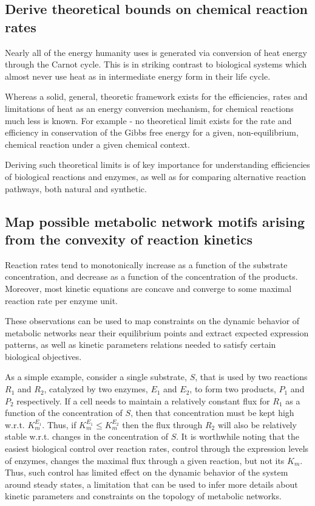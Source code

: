 \documentclass[notitlepage]{article}
\begin{document}
\subsection{Derive theoretical bounds on chemical reaction rates}
Nearly all of the energy humanity uses is generated via conversion of heat energy through the Carnot cycle.
This is in striking contrast to biological systems which almost never use heat as in intermediate energy form in their life cycle.

Whereas a solid, general, theoretic framework exists for the efficiencies, rates and limitations of heat as an energy conversion mechanism, for chemical reactions much less is known.
For example - no theoretical limit exists for the rate and efficiency in conservation of the Gibbs free energy for a given, non-equilibrium, chemical reaction under a given chemical context.

Deriving such theoretical limits is of key importance for understanding efficiencies of biological reactions and enzymes, as well as for comparing alternative reaction pathways, both natural and synthetic.

\subsection{Map possible metabolic network motifs arising from the convexity of reaction kinetics}
Reaction rates tend to monotonically increase as a function of the substrate concentration, and decrease as a function of the concentration of the products.
Moreover, most kinetic equations are concave and converge to some maximal reaction rate per enzyme unit.

These observations can be used to map constraints on the dynamic behavior of metabolic networks near their equilibrium points and extract expected expression patterns, as well as kinetic parameters relations needed to satisfy certain biological objectives.

As a simple example, consider a single substrate, $S$, that is used by two reactions $R_1$ and $R_2$, catalyzed by two enzymes, $E_1$ and $E_2$, to form two products, $P_1$ and $P_2$ respectively.
If a cell needs to maintain a relatively constant flux for $R_1$ as a function of the concentration of $S$, then 
that concentration must be kept high w.r.t. $K_m^{E_1}$.
Thus, if $K_m^{E_1} \le K_m^{E_2}$ then the flux through $R_2$ will also be relatively stable w.r.t. changes in the concentration of $S$.
It is worthwhile noting that the easiest biological control over reaction rates, control through the expression levels of enzymes, changes the maximal flux through a given reaction, but not its $K_m$.
Thus, such control has limited effect on the dynamic behavior of the system around steady states, a limitation that can be used to infer more details about kinetic parameters and constraints on the topology of metabolic networks.
\end{document}
